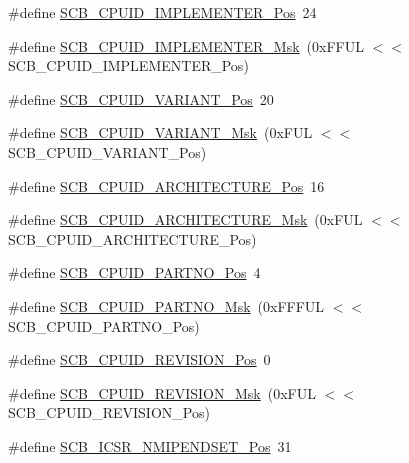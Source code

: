 \begin{DoxyCompactItemize}
\#define \hyperlink{group___c_m_s_i_s___s_c_b_ga58686b88f94f789d4e6f429fe1ff58cf}{S\+C\+B\+\_\+\+C\+P\+U\+I\+D\+\_\+\+I\+M\+P\+L\+E\+M\+E\+N\+T\+E\+R\+\_\+\+Pos}~24
\item 
\#define \hyperlink{group___c_m_s_i_s___s_c_b_ga0932b31faafd47656a03ced75a31d99b}{S\+C\+B\+\_\+\+C\+P\+U\+I\+D\+\_\+\+I\+M\+P\+L\+E\+M\+E\+N\+T\+E\+R\+\_\+\+Msk}~(0x\+F\+F\+U\+L $<$$<$ S\+C\+B\+\_\+\+C\+P\+U\+I\+D\+\_\+\+I\+M\+P\+L\+E\+M\+E\+N\+T\+E\+R\+\_\+\+Pos)
\item 
\#define \hyperlink{group___c_m_s_i_s___s_c_b_ga104462bd0815391b4044a70bd15d3a71}{S\+C\+B\+\_\+\+C\+P\+U\+I\+D\+\_\+\+V\+A\+R\+I\+A\+N\+T\+\_\+\+Pos}~20
\item 
\#define \hyperlink{group___c_m_s_i_s___s_c_b_gad358dfbd04300afc1824329d128b99e8}{S\+C\+B\+\_\+\+C\+P\+U\+I\+D\+\_\+\+V\+A\+R\+I\+A\+N\+T\+\_\+\+Msk}~(0x\+F\+U\+L $<$$<$ S\+C\+B\+\_\+\+C\+P\+U\+I\+D\+\_\+\+V\+A\+R\+I\+A\+N\+T\+\_\+\+Pos)
\item 
\#define \hyperlink{group___c_m_s_i_s___s_c_b_gaf8b3236b08fb8e840efb682645fb0e98}{S\+C\+B\+\_\+\+C\+P\+U\+I\+D\+\_\+\+A\+R\+C\+H\+I\+T\+E\+C\+T\+U\+R\+E\+\_\+\+Pos}~16
\item 
\#define \hyperlink{group___c_m_s_i_s___s_c_b_gafae4a1f27a927338ae9dc51a0e146213}{S\+C\+B\+\_\+\+C\+P\+U\+I\+D\+\_\+\+A\+R\+C\+H\+I\+T\+E\+C\+T\+U\+R\+E\+\_\+\+Msk}~(0x\+F\+U\+L $<$$<$ S\+C\+B\+\_\+\+C\+P\+U\+I\+D\+\_\+\+A\+R\+C\+H\+I\+T\+E\+C\+T\+U\+R\+E\+\_\+\+Pos)
\item 
\#define \hyperlink{group___c_m_s_i_s___s_c_b_ga705f68eaa9afb042ca2407dc4e4629ac}{S\+C\+B\+\_\+\+C\+P\+U\+I\+D\+\_\+\+P\+A\+R\+T\+N\+O\+\_\+\+Pos}~4
\item 
\#define \hyperlink{group___c_m_s_i_s___s_c_b_ga98e581423ca016680c238c469aba546d}{S\+C\+B\+\_\+\+C\+P\+U\+I\+D\+\_\+\+P\+A\+R\+T\+N\+O\+\_\+\+Msk}~(0x\+F\+F\+F\+U\+L $<$$<$ S\+C\+B\+\_\+\+C\+P\+U\+I\+D\+\_\+\+P\+A\+R\+T\+N\+O\+\_\+\+Pos)
\item 
\#define \hyperlink{group___c_m_s_i_s___s_c_b_ga3c3d9071e574de11fb27ba57034838b1}{S\+C\+B\+\_\+\+C\+P\+U\+I\+D\+\_\+\+R\+E\+V\+I\+S\+I\+O\+N\+\_\+\+Pos}~0
\item 
\#define \hyperlink{group___c_m_s_i_s___s_c_b_ga2ec0448b6483f77e7f5d08b4b81d85df}{S\+C\+B\+\_\+\+C\+P\+U\+I\+D\+\_\+\+R\+E\+V\+I\+S\+I\+O\+N\+\_\+\+Msk}~(0x\+F\+U\+L $<$$<$ S\+C\+B\+\_\+\+C\+P\+U\+I\+D\+\_\+\+R\+E\+V\+I\+S\+I\+O\+N\+\_\+\+Pos)
\item 
\#define \hyperlink{group___c_m_s_i_s___s_c_b_ga750d4b52624a46d71356db4ea769573b}{S\+C\+B\+\_\+\+I\+C\+S\+R\+\_\+\+N\+M\+I\+P\+E\+N\+D\+S\+E\+T\+\_\+\+Pos}~31
$$
\end{DoxyCompactItemize}
